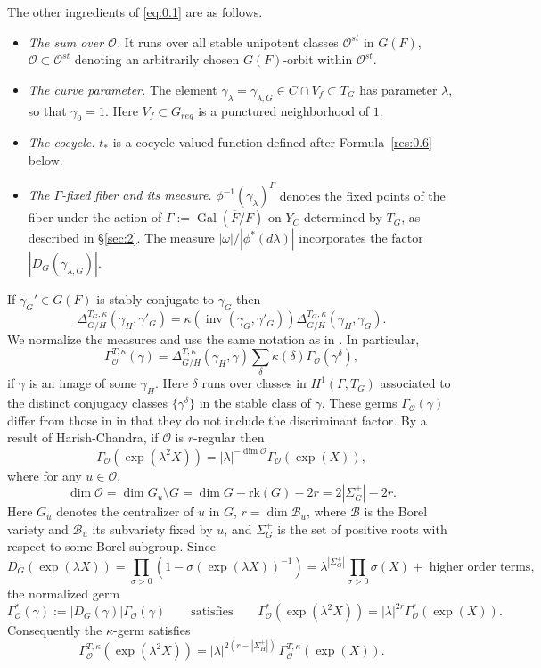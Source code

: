 \documentclass[12pt,letterpaper]{amsart}
\theoremstyle{plain}
\theoremstyle{definition}
\theoremstyle{remark}
\theoremstyle{definition}
\DeclareMathOperator{\Gal}{Gal}
\DeclareMathOperator{\inv}{inv}
\begin{document}
The other ingredients of \eqref{eq:0.1} are as follows.
\begin{itemize}
\item \emph{The sum over ${\mathcal O}$.} It runs over all stable unipotent
classes ${\mathcal O}^{st}$ in $G(F)$, ${\mathcal O}\subset {\mathcal O}^{st}$
denoting an arbitrarily chosen $G(F)$-orbit within ${\mathcal O}^{st}$.
\item \emph{The curve parameter.} The element
$\gamma_\lambda=\gamma_{\lambda,G}\in C\cap V_f\subset T_G$
has parameter $\lambda$, so that $\gamma_0=1$. Here $V_f\subset G_{reg}$
is a punctured neighborhood of $1$.
\item \emph{The cocycle.} $t_*$ is a cocycle-valued function defined after
Formula~\ref{res:0.6} below.
\item \emph{The $\Gamma$-fixed fiber and its measure.}
$\phi^{-1}(\gamma_\lambda)^\Gamma$ denotes the fixed points of the fiber
under the action of $\Gamma:=\Gal(\overline{F}/F)$ on $Y_C$ determined
by $T_G$, as described in \S\ref{sec:2}. The measure
${|\omega|/ |\phi^*(d\lambda)|}$ incorporates the factor
$|D_G(\gamma_{\lambda,G})|$.
\end{itemize}
If $\gamma_G'\in G(F)$ is stably conjugate to $\gamma_G$ then
\[
\Delta_{G/H}^{T_G,\kappa}(\gamma_H,\gamma'_G)
=\kappa(\inv(\gamma_G,\gamma'_G))
\Delta_{G/H}^{T_G,\kappa}(\gamma_H,\gamma_G).
\]
We normalize
the measures and use the same notation as in \cite{LS89}. In particular,
\[
\Gamma_{{\mathcal O}}^{T,\kappa}(\gamma)=
\Delta_{G/H}^{T,\kappa}(\gamma_H,\gamma)\sum_\delta \kappa(\delta)
\Gamma_{\mathcal O}(\gamma^\delta),
\]
if $\gamma$ is an image of some $\gamma_H$. Here $\delta$ runs over
classes in $H^1(\Gamma,T_G)$ associated to the distinct
conjugacy classes $\{\gamma^\delta\}$ in the stable class of $\gamma$.
These germs
$\Gamma_{\mathcal O}(\gamma)$ differ from those in \cite{Sh72}
in that they do not include the discriminant factor.
By a result of Harish-Chandra, if
${\mathcal O}$ is $r$-regular then
\[
\Gamma_{\mathcal O}(\exp(\lambda^2 X))=|\lambda|^{-\dim {\mathcal O}}
\Gamma_{\mathcal O}(\exp( X)),
\]
where for any $u\in {\mathcal O}$,
\[
\dim{\mathcal O}=\dim G_u\setminus G=\dim G -\mathrm{rk}(G)-2r=2|\Sigma^+_G|-2r.
\]
Here $G_u$ denotes the centralizer of $u$ in $G$,
$r=\dim {\mathcal B}_u$, where ${\mathcal B}$ is the Borel variety and
${\mathcal B}_u$ its subvariety fixed by $u$,
and $\Sigma^+_G$ is the set of positive roots with respect to some Borel
subgroup.
Since
\[
D_G(\exp(\lambda X))=\prod_{\sigma >0}(1-\sigma(\exp(\lambda X))^{-1})
=\lambda^{|\Sigma^+_G|}\prod_{\sigma >0}\sigma(X)+\text{ higher order terms},
\]
the normalized germ
\[
\Gamma^*_{\mathcal O}(\gamma):=|D_G(\gamma)|\Gamma_{\mathcal O}(\gamma)
\qquad\text{satisfies}\qquad
\Gamma^*_{\mathcal O}(\exp(\lambda^2 X))
=|\lambda|^{2r}\Gamma^*_{\mathcal O}(\exp( X)).
\]
Consequently the $\kappa$-germ satisfies
\begin{equation}\tag{0.1A}\label{eq:0.1A}
\Gamma_{{\mathcal O}}^{T,\kappa}(\exp(\lambda^2 X))
=|\lambda|^{2(r-|\Sigma_H^+|)}\,\Gamma_{{\mathcal O}}^{T,\kappa}(\exp(X)).
\end{equation}
\end{document}
